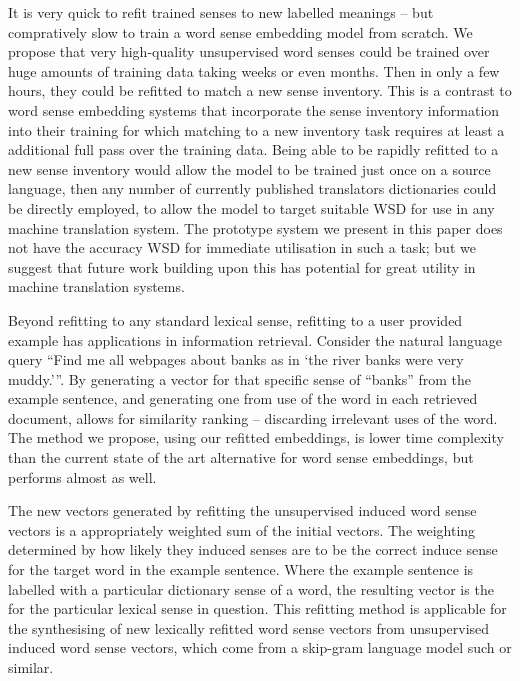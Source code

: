\documentclass{sig-alternate}
\begin{document}
It is very quick to refit trained senses to new labelled meanings -- but compratively slow to train a word sense embedding model from scratch. We propose that very high-quality unsupervised word senses could be trained over huge amounts of training data taking weeks or even months. Then in only a few hours, they could be refitted to match a new sense inventory.  This is a contrast to word sense embedding systems that incorporate the sense inventory information into their training \parencite{Chen2014, iacobacci2015sensembed} for which matching to a new inventory task requires at least a additional full pass over the training data.
Being able to be rapidly refitted to a new sense inventory would allow the model to be trained just once on a source language, then any number of currently published translators dictionaries could be directly employed, to allow the model to target suitable WSD for use in any machine translation system. The prototype system we present in this paper does not have the accuracy WSD for immediate utilisation in such a task; but we suggest that future work building upon this has potential for great utility in machine translation systems.

Beyond refitting to any standard lexical sense, refitting to a user provided example has applications in information retrieval. Consider the natural language query \enquote{Find me all webpages about banks as in \enquote{the river banks were very muddy.}}. By generating a vector for that specific sense of ``banks'' from the example sentence, and generating one from use of the word in each retrieved document, allows for similarity ranking -- discarding irrelevant uses of the word. The method we propose, using our refitted embeddings, is lower time complexity than the current state of the art alternative for word sense embeddings, but performs almost as well.

The new vectors generated by refitting the unsupervised induced word sense vectors is a appropriately weighted sum of the initial vectors. The weighting determined by how likely they induced senses are to be the correct induce sense for the target word in the example sentence. Where the example sentence is labelled with a particular dictionary sense of a word, the resulting vector is the for the particular lexical sense in question. This refitting method is applicable for the synthesising of new lexically refitted word sense vectors from unsupervised induced word sense vectors, which come from a skip-gram language model such or similar.
\end{document}
